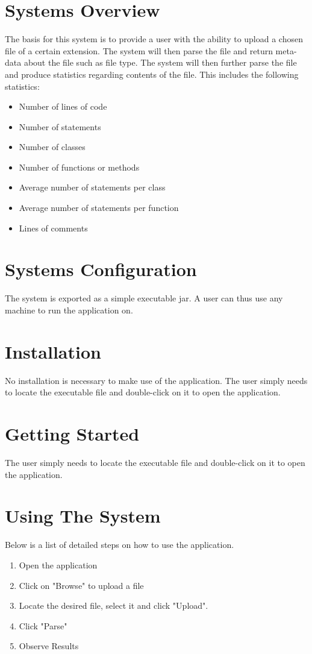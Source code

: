 \documentclass[11pt]{article}
\begin{document}


\setcounter{tocdepth}{3}
\setcounter{secnumdepth}{5}
\tableofcontents

\newpage
\section{Systems Overview}
The basis for this system is to provide a user with the ability to upload a chosen file of a certain extension. The system will then parse the file and return meta-data about the file such as file type. The system will then further parse the file and produce statistics regarding contents of the file. This includes the following statistics:
\begin{itemize}
\item Number of lines of code
\item Number of statements
\item Number of classes
\item Number of functions or methods
\item Average number of statements per class
\item Average number of statements per function
\item Lines of comments
\end{itemize}

\section{Systems Configuration}
The system is exported as a simple executable jar. A user can thus use any machine to run the application on.

\section{Installation}
No installation is necessary to make use of the application. The user simply needs to locate the executable file and double-click on it to open the application.

\section{Getting Started}
The user simply needs to locate the executable file and double-click on it to open the application.


\section{Using The System}
Below is a list of detailed steps on how to use the application.
\begin{enumerate}
\item Open the application

\item Click on "Browse" to upload a file

\item Locate the desired file, select it and click "Upload".

\item Click "Parse"

\item Observe Results
\end{enumerate}
\end{document}
